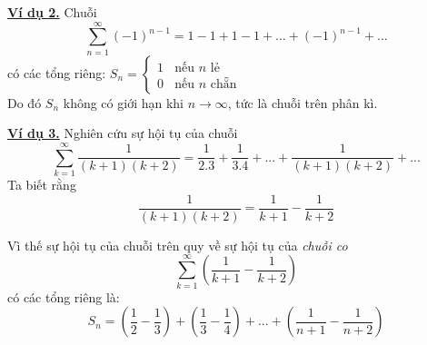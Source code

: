 \documentclass[compress,  hyperref={unicode, bookmarks=true, pdfpagemode=FullScreen}]{beamer}
\begin{document}
\begin{frame}
\underline{\bf Ví dụ 2.}
\pause
Chuỗi
\[\sum\limits_{n = 1}^\infty  {{{( - 1)}^{n - 1}}}  = 1 - 1 + 1 - 1 + ... + {( - 1)^{n - 1}} + ...\]
\pause
có các tổng riêng:
$S_n = \left\{\begin{array}{l}
1 \ \ \ \ \textrm{nếu $n$ lẻ}\\
0 \ \ \ \ \textrm{nếu $n$ chẵn}
\end{array}\right.$\\
\medskip
Do đó $S_n$ không có giới hạn khi $n \to \infty$\pause , tức là chuỗi trên phân kì.
\end{frame}
\begin{frame}
\underline{\bf Ví dụ 3.}
\pause
Nghiên cứu sự hội tụ của chuỗi
\[\sum\limits_{k = 1}^\infty  {\dfrac{1}{{(k + 1)(k + 2)}}}  = \dfrac{1}{{2.3}} + \dfrac{1}{{3.4}} + ... + \dfrac{1}{{(k + 1)(k + 2)}} + ...\]
\pause
Ta biết rằng
\[\dfrac{1}{{(k + 1)(k + 2)}} = \dfrac{1}{{k + 1}} - \dfrac{1}{{k + 2}}\]
\end{frame}
\begin{frame}
Vì thế sự hội tụ của chuỗi trên quy về sự hội tụ của \textit{chuỗi co} 
\[\sum\limits_{k = 1}^\infty  {\left( {\dfrac{1}{{k + 1}} - \dfrac{1}{{k + 2}}} \right)} \]
\pause
có các tổng riêng là:
\[{S_n} = \left( {\dfrac{1}{2} - \dfrac{1}{3}} \right) + \left( {\dfrac{1}{3} - \dfrac{1}{4}} \right) + ... + \left( {\dfrac{1}{{n + 1}} - \dfrac{1}{{n + 2}}} \right)\]
\end{frame}
\end{document}
